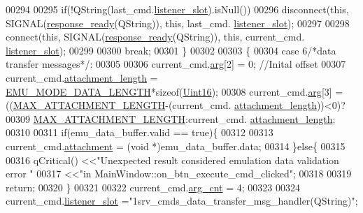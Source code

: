 \begin{DoxyCode}
00294 
00295             \textcolor{keywordflow}{if}(!QString(last\_cmd.\hyperlink{a00004_abb76d8edb39876deb60975c8fd784b3f}{listener\_slot}).isNull())
00296             disconnect(\textcolor{keyword}{this}, SIGNAL(\hyperlink{a00017_a3f6396874778799cf07a7a0149e54977}{response\_ready}(QString)), \textcolor{keyword}{this}, last\_cmd.
      \hyperlink{a00004_abb76d8edb39876deb60975c8fd784b3f}{listener\_slot});
00297 
00298             connect(\textcolor{keyword}{this}, SIGNAL(\hyperlink{a00017_a3f6396874778799cf07a7a0149e54977}{response\_ready}(QString)), \textcolor{keyword}{this}, current\_cmd.
      \hyperlink{a00004_abb76d8edb39876deb60975c8fd784b3f}{listener\_slot});
00299 
00300     \textcolor{keywordflow}{break};
00301 \}
00302 
00303 \{
00304     \textcolor{keywordflow}{case} 6\textcolor{comment}{/*data transfer messages*/}:
00305 
00306             current\_cmd.\hyperlink{a00004_a56e6c2d7315d0ae60a51e8b140c9cfe4}{arg}[2]              = 0; \textcolor{comment}{//Inital offset}
00307             current\_cmd.\hyperlink{a00004_ae5afad7c81dab7d9ab6587251aafdbf4}{attachment\_length}   = 
      \hyperlink{a00006_af4c3a8ad94feb4d7bda7f107f34baf41}{EMU\_MODE\_DATA\_LENGTH}*\textcolor{keyword}{sizeof}(\hyperlink{a00004_aae7407b021d43f7193a81a58cfb3e297}{Uint16});
00308             current\_cmd.\hyperlink{a00004_a56e6c2d7315d0ae60a51e8b140c9cfe4}{arg}[3]              = ((\hyperlink{a00086_aa8abe3a822c64813f7aaba3ca7e3db9c}{MAX\_ATTACHMENT\_LENGTH}-(current\_cmd.
      \hyperlink{a00004_ae5afad7c81dab7d9ab6587251aafdbf4}{attachment\_length}))<0)?
00309                                                \hyperlink{a00086_aa8abe3a822c64813f7aaba3ca7e3db9c}{MAX\_ATTACHMENT\_LENGTH}:current\_cmd.
      \hyperlink{a00004_ae5afad7c81dab7d9ab6587251aafdbf4}{attachment\_length};
00310 
00311             \textcolor{keywordflow}{if}(emu\_data\_buffer.valid == \textcolor{keyword}{true})\{
00312 
00313             current\_cmd.\hyperlink{a00004_a0b844fe783d7e252159a9641b949e83c}{attachment} = (\textcolor{keywordtype}{void} *)emu\_data\_buffer.data;
00314             \}\textcolor{keywordflow}{else}\{
00315 
00316                 qCritical() <<\textcolor{stringliteral}{"Unexpected result considered emulation data validation error "}
00317                             <<\textcolor{stringliteral}{"in MainWindow::on\_btn\_execute\_cmd\_clicked"};
00318 
00319             \textcolor{keywordflow}{return};
00320             \}
00321 
00322             current\_cmd.\hyperlink{a00004_affcea772a1bc5362ebbc274b6166f81b}{arg\_cnt}  = 4;
00323 
00324             current\_cmd.\hyperlink{a00004_abb76d8edb39876deb60975c8fd784b3f}{listener\_slot}   =\textcolor{stringliteral}{"1srv\_cmds\_data\_transfer\_msg\_handler(QString)"};

\end{DoxyCode}
